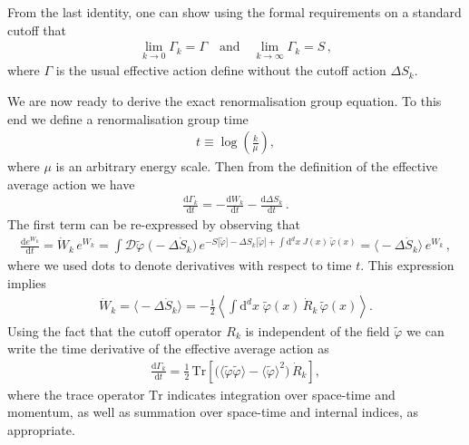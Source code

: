\documentclass[11pt]{book}
\newcommand{\Tr}{\mathrm{Tr}}
\numberwithin{equation}{chapter}
\begin{document}
From the last identity, one can show using the
formal requirements on a standard cutoff that
\begin{align}
  \lim_{k \rightarrow 0} \Gamma_k = \Gamma
  \quad \text{and} \quad
  \lim_{k \rightarrow \infty} \Gamma_k = S \,,
\end{align}
where $\Gamma$ is the usual effective action
define without the cutoff action $\Delta S_k$.

We are now ready to derive the exact renormalisation
group equation. To this end we define a renormalisation
group time
\begin{align}
  t \equiv \log \left( \frac k{\mu} \right) ,
\end{align}
where $\mu$ is an arbitrary energy scale. Then from
the definition of the effective average action we
have
\begin{align}
  \frac{ \mathrm d \Gamma_k }{ \mathrm dt }
  = - \frac{ \mathrm d W_k }{ \mathrm dt }
  - \frac{ \mathrm d \Delta S_k }{ \mathrm dt } \,.
\end{align}
The first term can be re-expressed by observing that
\begin{align}
  \frac{ \mathrm d e^{W_k} }{ \mathrm dt }
  = \dot W_k \, e^{W_k}
  = \int \mathcal D \tilde \varphi \;
  \big( - \Delta \dot S_k \big) \,
  e^{
    - S \lbrack \tilde \varphi \rbrack
    - \Delta S_k \lbrack \tilde \varphi \rbrack
    + \int \mathrm d^dx \; J(x) \, \tilde \varphi(x)
  }
  = \big\langle - \Delta \dot S_k \big\rangle \, e^{W_k} \,,
\end{align}
where we used dots to denote derivatives with respect to
time $t$. This expression implies
\begin{align}
  \dot W_k
  = \big\langle - \Delta \dot S_k \big\rangle
  = - \frac 12
  \left\langle
    \int \mathrm d^dx \; \tilde \varphi (x) \, \dot R_k \, \tilde \varphi(x)
  \right\rangle .
\end{align}
Using the fact that the cutoff operator $R_k$ is independent
of the field $\tilde \varphi$ we can write the
time derivative of the effective average action as
\begin{align}
  \frac{ \mathrm d \Gamma_k }{ \mathrm dt }
  = \frac 12 \, \Tr
  \left[
    \big(
      \langle \tilde \varphi \tilde \varphi \rangle
      - \langle \tilde \varphi \rangle ^ 2
    \big)
    \, \dot R_k
  \right] ,
\end{align}
where the trace operator $\Tr$ indicates integration
over space-time and momentum, as well as summation over
space-time and internal indices, as appropriate.
\end{document}
